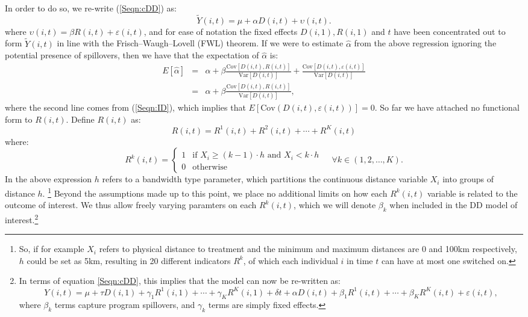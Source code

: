 \documentclass[12pt]{article}
\newcommand{\Var}{\mathrm{Var}}
\newcommand{\Cov}{\mathrm{Cov}}
\newcommand{\Bias}[2]{\frac{\Cov[#1,#2]}{\Var[#1]}}
\begin{document}
\begin{spacing}{1.3}
In order to do so, we re-write (\ref{Seqn:cDD}) as:
\begin{equation}
\label{Seqn:cDDconc}
\tilde{Y}(i,t)=\mu + \alpha D(i,t) + \upsilon(i,t).
\end{equation}
where $\upsilon(i,t)=\beta R(i,t)+\varepsilon(i,t)$, and for ease of notation
the fixed effects $D(i,1), R(i,1)$ and $t$ have been concentrated out to form
$\tilde{Y}(i,t)$ in line with the  Frisch--Waugh--Lovell (FWL) theorem.  If we 
were to estimate $\hat\alpha$ from the above regression ignoring the potential 
presence of spillovers, then we have that the expectation of $\hat\alpha$ is:
\begin{eqnarray}
\label{Seqn:alphaExp}
E[\hat\alpha] &=& \alpha + \beta\Bias{D(i,t)}{R(i,t)}+\Bias{D(i,t)}{\varepsilon(i,t)} \nonumber \\ 
              &=& \alpha + \beta\Bias{D(i,t)}{R(i,t)},
\end{eqnarray}
where the second line comes from (\ref{Seqn:ID}), which implies that 
$E[\Cov(D(i,t),\varepsilon(i,t))]=0$.  So far we have attached no functional form 
to $R(i,t)$.  Define $R(i,t)$ as:
\begin{equation}
\label{Seqn:Runpack}
R(i,t) = R^1(i,t)+R^2(i,t)+ \cdots + R^K(i,t)
\end{equation}  
where:
\begin{equation}
\label{Seqn:Rpar}
 R^k(i,t) =
  \begin{cases}
   1   & \text{if\ \ } X_i\geq(k-1)\cdot h \text{\ \ and \ } X_i<k\cdot h \\
   0   & \text{otherwise} 
  \end{cases}\ \ \ \ \ \forall k \in (1,2,\ldots,K).
\end{equation}
In the above expression $h$ refers to a bandwidth type parameter, which 
partitions the continuous distance variable $X_i$ into groups of distance $h$.%
\footnote{So, if for example $X_i$ refers to physical distance to treatment and 
the minimum and maximum distances are 0 and 100km respectively, $h$ could be set 
as 5km, resulting in 20 different indicators $R^k$, of which each individual $i$ 
in time $t$ can have at most one switched on.}  Beyond the assumptions made up
to this point, we place no additional limits on how each $R^{k}(i,t)$ variable
is related to the outcome of interest.  We thus allow freely varying paramters
on each $R^{k}(i,t)$, which we will denote $\beta_k$ when included in the DD
model of interest.\footnote{In terms of equation
  \ref{Seqn:cDD}, this implies that the model can now be re-written as:
  \[
  Y(i,t)=\mu+\tau D(i,1) + \gamma_1 R^1(i,1) + \cdots + \gamma_K R^K(i,1) + \delta t
  + \alpha D(i,t) + \beta_1 R^1(i,t) + \cdots + \beta_KR^K(i,t)+ \varepsilon(i,t),
  \]
  where $\beta_k$ terms capture program spillovers, and $\gamma_k$ terms are
  simply fixed effects.
}



\end{spacing}
\end{document}
